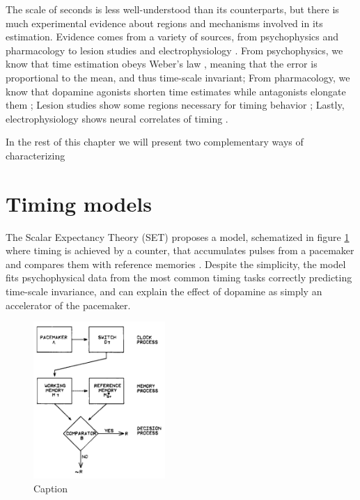     The scale of seconds is less well-understood than its counterparts, but there is much experimental evidence about regions and mechanisms involved in its estimation. Evidence comes from a variety of sources, from psychophysics \cite{ohmae2017cerebellar} and pharmacology \cite{pine2010dopamine, meck2012gene, drew2003effects, cheng2016clock, ludvig2008stimulus} to lesion studies \cite{} and electrophysiology \cite{bakhurin2017differential}. From psychophysics, we know that time estimation obeys Weber's law \cite{gibbon1977scalar}, meaning that the error is proportional to the mean, and thus time-scale invariant; From pharmacology, we know that dopamine agonists shorten time estimates while antagonists elongate them \cite{}; Lesion studies show some regions necessary for timing behavior \cite{};
    Lastly, electrophysiology shows neural correlates of timing \cite{}.
    
    In the rest of this chapter we will present two complementary ways of characterizing 
    
    
\section{Timing models}
\label{sec:models}
    The Scalar Expectancy Theory (SET) proposes a model, schematized in figure \ref{fig:set_schema} where timing is achieved by a counter, that accumulates pulses from a pacemaker and compares them with reference memories \cite{}. Despite the simplicity, the model fits psychophysical data from the most common timing tasks \cite{} correctly predicting time-scale invariance, and can explain the effect of dopamine as simply an accelerator of the pacemaker. 
    
    \begin{figure}
        \centering
        \includegraphics[width=5cm]{figures/SET_model_schema.png}
        \caption{Caption}
        \label{fig:set_schema}
    \end{figure}
    
